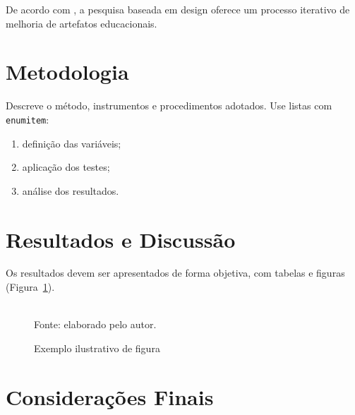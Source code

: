\documentclass[12pt,oneside]{article}
\begin{document}
De acordo com \cite{pimentelDesignScienceResearch2020}, a pesquisa baseada em
design oferece um processo iterativo de melhoria de artefatos educacionais.

\section{Metodologia}\label{sec:metodologia}
Descreve o método, instrumentos e procedimentos adotados.  
Use listas com \texttt{enumitem}:
\begin{enumerate}[label=\alph*), itemsep=0pt, topsep=0pt, parsep=0pt, partopsep=0pt]
  \item definição das variáveis;
  \item aplicação dos testes;
  \item análise dos resultados.
\end{enumerate}

\section{Resultados e Discussão}\label{sec:resultadosDiscussao}

Os resultados devem ser apresentados de forma objetiva, com tabelas e figuras
(Figura~\ref{fig:exemplo}).

\begin{figure}[ht]
\centering
\caption{Exemplo ilustrativo de figura}
\begingroup
\setlength{\fboxsep}{0pt}
\endgroup
\\[2pt]
{\small Fonte: elaborado pelo autor.}
\label{fig:exemplo}
\end{figure}
\vspace{-6pt}

\section{Considerações Finais}\label{sec:consideracoesFinais}
\end{document}
